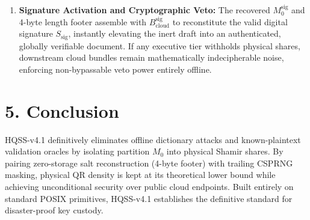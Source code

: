 \documentclass[11pt,a4paper,titlepage]{article}
\newif\ifja
\begin{document}
\begin{enumerate}
    The public cloud hosts the full sequence of intermediate bundles $\{B_{\text{cloud}}^{(1)}, B_{\text{cloud}}^{(2)}, \dots, B_{\text{cloud}}^{\text{sig}}\}$. Because each intermediate bundle strictly lacks its PBKDF2 salt, IV, and lead ciphertext block, the cloud repository yields strictly zero mutual information. During activation, Tier 1's physical quorum combines to yield $P_{\text{core}}^{(1)}$, unwrapping $B_{\text{cloud}}^{(1)}$ to expose Tier 2's core input, cascading deterministically down the tree until the signature core $P_{\text{core}}^{\text{sig}}$ is unsealed.
  \item \textbf{Signature Activation and Cryptographic Veto:}
    The recovered $M_0^{\text{sig}}$ and 4-byte length footer assemble with $B_{\text{cloud}}^{\text{sig}}$ to reconstitute the valid digital signature $S_{\text{sig}}$, instantly elevating the inert draft into an authenticated, globally verifiable document. If any executive tier withholds physical shares, downstream cloud bundles remain mathematically indecipherable noise, enforcing non-bypassable veto power entirely offline.
\end{enumerate}
\fi

\section{%
  \ifja 5. 結論 \else 5. Conclusion \fi
}

\ifja
HQSS-v4.1は、ハイブリッド秘密分散における最大の死角であった「クラウド単体からの鍵導出・辞書攻撃オラクルの成立可能性」を、$M_0$（先頭スライス）の物理エスクロー隔離によって完全に無力化した。
ソルト実体を持たずオフセットフッター（4バイト）のみを $M_0$ と共にShamir秘密分散する設計により、物理QRコードのセル密度を極限まで低減させたまま、クラウド側に対する完全な情報理論的安全性を達成している。
外部クラウドの信頼性や複雑怪奇な独自バイナリに依存せず、POSIX標準コマンドのみで災害からマスターキーを蘇生させる、オフラインファースト時代の極致たる鍵保管プロトコルである。
\else
HQSS-v4.1 definitively eliminates offline dictionary attacks and known-plaintext validation oracles by isolating partition $M_0$ into physical Shamir shares. By pairing zero-storage salt reconstruction (4-byte footer) with trailing CSPRNG masking, physical QR density is kept at its theoretical lower bound while achieving unconditional security over public cloud endpoints. Built entirely on standard POSIX primitives, HQSS-v4.1 establishes the definitive standard for disaster-proof key custody.
\fi
\end{document}
